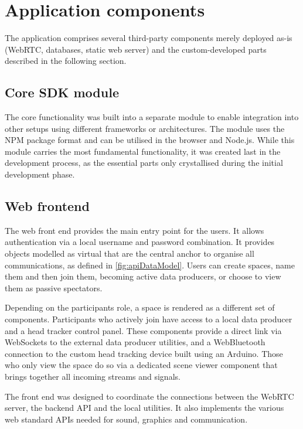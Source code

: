 \section{Application components}
\label{sec:application-components}

The application comprises several third-party components merely deployed as-is (WebRTC, databases, static web server) and the custom-developed parts described in the following section.

\subsection{Core SDK module}
\label{subsec:core-sdk-module}

The core functionality was built into a separate module to enable integration into other setups using different frameworks or architectures.
The module uses the \ac{NPM} package format and can be utilised in the browser and Node.js.
While this module carries the most fundamental functionality, it was created last in the development process, as the essential parts only crystallised during the initial development phase.

\subsection{Web frontend}
\label{subsec:web-frontend}

The web front end provides the main entry point for the users.
It allows authentication via a local username and password combination.
It provides objects modelled as virtual  that are the central anchor to organise all communications, as defined in \autoref{fig:apiDataModel}.
Users can create spaces, name them and then join them, becoming active data producers, or choose to view them as passive spectators.

Depending on the participant\textquotesingle s role, a space is rendered as a different set of components.
Participants who actively join have access to a local data producer and a head tracker control panel.
These components provide a direct link via WebSockets to the external data producer utilities, and a WebBluetooth connection to the custom head tracking device built using an Arduino.
Those who only view the space do so via a dedicated scene viewer component that brings together all incoming streams and signals.

The front end was designed to coordinate the connections between the WebRTC server, the backend \ac{API} and the local utilities.
It also implements the various web standard \acp{API} needed for sound, graphics and communication.

